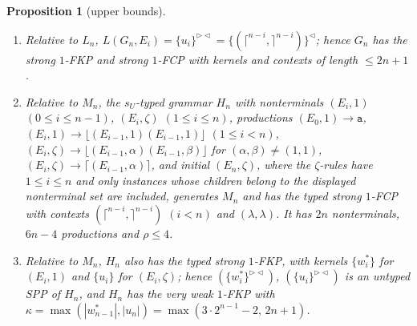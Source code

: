 \documentclass[11pt]{article}
\numberwithin{equation}{section}
\theoremstyle{plain}
\newtheorem{proposition}[theorem]{Proposition}
\theoremstyle{definition}
\theoremstyle{remark}
\theoremstyle{plain}
\newcommand{\eps}{\lambda}
\newcommand{\Lc}{^{\lhd}}
\newcommand{\RL}{^{\rhd\lhd}}
\newcommand{\Lfl}{\lfloor}
\newcommand{\Rfl}{\rfloor}
\newcommand{\Lce}{\lceil}
\newcommand{\Rce}{\rceil}
\newcommand{\ta}{\mathtt a}
\begin{document}
\begin{proposition}[upper bounds]\label{prop:deletion-upper}
\begin{enumerate}[label=\textup{(\alph*)},nosep]
\item Relative to $L_n$, $L(G_n,E_i)=\{u_i\}\RL=\{(\Lce^{n-i},\Rce^{n-i})\}\Lc$;
hence $G_n$ has the strong $1$-FKP and strong $1$-FCP with kernels and
contexts of length $\le2n+1$.
\item Relative to $M_n$, the $s_U$-typed grammar $H_n$ with nonterminals
$(E_i,1)$ $(0\le i\le n-1)$, $(E_i,\zeta)$ $(1\le i\le n)$, productions
$(E_0,1)\to\ta$, $(E_i,1)\to\Lfl(E_{i-1},1)(E_{i-1},1)\Rfl$ $(1\le i<n)$,
$(E_i,\zeta)\to\Lfl(E_{i-1},\alpha)(E_{i-1},\beta)\Rfl$ for
$(\alpha,\beta)\ne(1,1)$, $(E_i,\zeta)\to\Lce(E_{i-1},\alpha)\Rce$, and initial
$(E_n,\zeta)$, where the $\zeta$-rules have $1\le i\le n$ and only
instances whose children belong to the displayed nonterminal set are
included, generates $M_n$ and has the typed strong $1$-FCP with contexts
$(\Lce^{n-i},\Rce^{n-i})$ $(i<n)$ and $(\eps,\eps)$.  It has $2n$
nonterminals, $6n-4$ productions and $\rho\le4$.
\item Relative to $M_n$, $H_n$ also has the typed strong $1$-FKP, with
kernels $\{w^*_i\}$ for $(E_i,1)$ and $\{u_i\}$ for $(E_i,\zeta)$; hence
$(\{w^*_i\}\RL)$, $(\{u_i\}\RL)$ is an untyped SPP of $H_n$, and $H_n$ has
the very weak $1$-FKP with $\kappa=\max(|w^*_{n-1}|,|u_n|)
=\max(3\cdot2^{n-1}-2,\,2n+1)$.
\end{enumerate}
\end{proposition}
\end{document}

